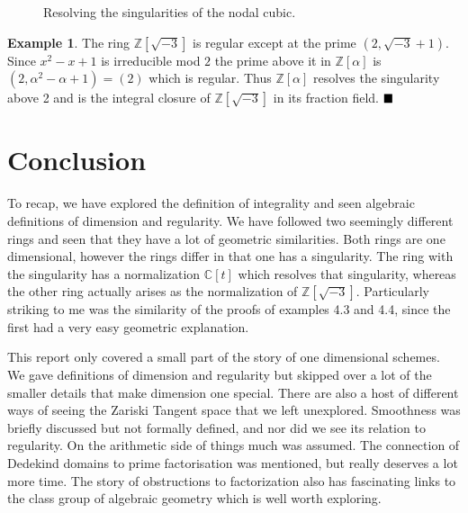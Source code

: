 \documentclass{article}
\DeclareMathOperator{\Spec}{Spec}
\newcommand{\Z}{\ensuremath{\mathbb{Z}}}
\newcommand{\C}{\ensuremath{\mathbb{C}}}
\theoremstyle{definition}
\newcounter{dummy} \numberwithin{dummy}{section}
\newtheorem{example}[dummy]{Example}
\begin{document}
\begin{figure}[h]
\caption{Resolving the singularities of the nodal cubic.}
\end{figure}

\begin{example}
  The ring $\Z[\sqrt{-3}]$ is regular except at the prime $(2, \sqrt{-3}+1)$.
  Since $x^2-x+1$ is irreducible mod $2$ the prime above it in $\Z[\alpha]$ is $(2,\alpha^2-\alpha+1)=(2)$ which is regular.
  Thus $\Z[\alpha]$ resolves the singularity above 2 and is the integral closure of $\Z[\sqrt{-3}]$ in its fraction field.
  $\hfill\blacksquare$
\end{example}

\section*{Conclusion}

To recap, we have explored the definition of integrality and seen algebraic definitions of dimension and regularity.
We have followed two seemingly different rings and seen that they have a lot of geometric similarities.
Both rings are one dimensional, however the rings differ in that one has a singularity.
The ring with the singularity has a normalization $\C[t]$ which resolves that singularity, whereas the other ring actually arises as the normalization of $\Z[\sqrt{-3}]$.
Particularly striking to me was the similarity of the proofs of examples 4.3 and 4.4, since the first had a very easy geometric explanation.

This report only covered a small part of the story of one dimensional schemes.
We gave definitions of dimension and regularity but skipped over a lot of the smaller details that make dimension one special.
There are also a host of different ways of seeing the Zariski Tangent space that we left unexplored.
Smoothness was briefly discussed but not formally defined, and nor did we see its relation to regularity.
On the arithmetic side of things much was assumed.
The connection of Dedekind domains to prime factorisation was mentioned, but really deserves a lot more time.
The story of obstructions to factorization also has fascinating links to the class group of algebraic geometry which is well worth exploring.


\clearpage
 
\end{document}
